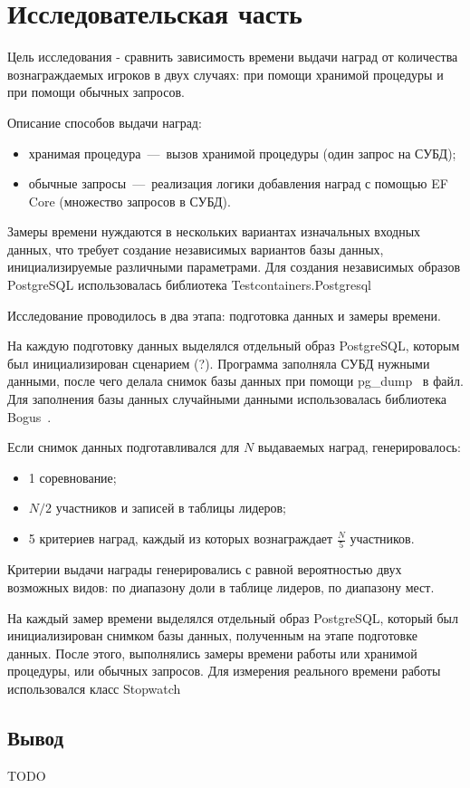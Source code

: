 \chapter{Исследовательская часть}
Цель исследования - сравнить зависимость времени выдачи наград от количества вознаграждаемых игроков в двух случаях: при помощи хранимой процедуры и при помощи обычных
запросов.

Описание способов выдачи наград:
\begin{itemize}
	\item хранимая процедура~---~вызов хранимой процедуры (один запрос на СУБД);
	\item обычные запросы~---~реализация логики добавления наград с помощью EF Core (множество запросов в СУБД).
\end{itemize}

Замеры времени нуждаются в нескольких вариантах изначальных входных данных, что требует создание независимых вариантов базы данных, инициализируемые различными параметрами. Для создания независимых образов PostgreSQL использовалась библиотека Testcontainers.Postgresql~\cite{testcontainers}

Исследование проводилось в два этапа: подготовка данных и замеры времени.

На каждую подготовку данных выделялся отдельный образ PostgreSQL, которым был инициализирован сценарием (?). Программа заполняла СУБД нужными данными, после чего делала снимок базы данных при помощи pg\_dump~\cite{postgresql_pgdump} в файл. Для заполнения базы данных случайными данными использовалась библиотека Bogus~\cite{bogus}.

Если снимок данных подготавливался для $N$ выдаваемых наград, генерировалось:
\begin{itemize}
	\item 1 соревнование;
	\item $N/2$ участников и записей в таблицы лидеров;
	\item 5 критериев наград, каждый из которых вознаграждает $\frac{N}{5}$ участников.
\end{itemize}
Критерии выдачи награды генерировались с равной вероятностью двух возможных видов: по диапазону доли в таблице лидеров, по диапазону мест.

На каждый замер времени выделялся отдельный образ PostgreSQL, который был инициализирован снимком базы данных, полученным на этапе подготовке данных. После этого, выполнялись замеры времени работы или хранимой процедуры, или обычных запросов. Для измерения реального времени работы использовался класс Stopwatch~\cite{stopwatch}



\section*{Вывод}

TODO

\clearpage
